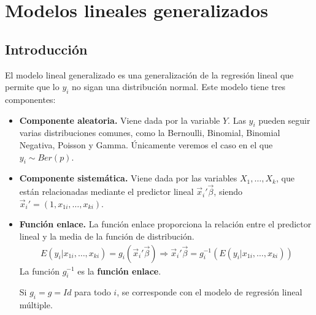 \chapter{Modelos lineales generalizados}

\section{Introducción}
\noindent El modelo lineal generalizado es una generalización de la regresión lineal que permite que lo $y_i$ no sigan una distribución normal. Este modelo tiene tres componentes:
\begin{itemize}
    \item \textbf{Componente aleatoria.}
          Viene dada por la variable $Y$.
          Las $y_i$ pueden seguir varias distribuciones comunes, como la Bernoulli, Binomial, Binomial Negativa, Poisson y Gamma.
          Únicamente veremos el caso en el que $y_i \sim Ber(p)$.
    \item \textbf{Componente sistemática.}
          Viene dada por las variables $X_1, \dots, X_k$, que están relacionadas mediante el predictor lineal $\vec{x}_i'\vec{\beta}$, siendo $\vec{x}_i' = (1, x_{1i}, \dots, x_{ki})$.

    \item \textbf{Función enlace.}
          La función enlace proporciona la relación entre el predictor lineal y la media de la función de distribución.
          \begin{align*}
              E(y_i | x_{1i}, \dots, x_{ki}) = g_i(\vec{x}_i'\vec{\beta}) \Rightarrow \vec{x}_i'\vec{\beta} = g_i^{-1}(E(y_i | x_{1i}, \dots, x_{ki}))
          \end{align*}
          La función $g_i^{-1}$ es la \textbf{función enlace}.
          \begin{obs}
              Si $g_i = g = Id$ para todo $i$, se corresponde con el modelo de regresión lineal múltiple.
          \end{obs}
\end{itemize}

